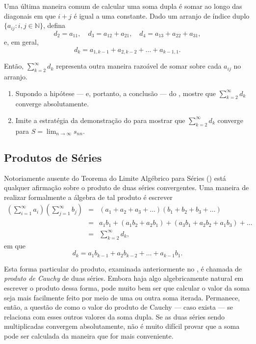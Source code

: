 Uma última maneira comum de calcular uma soma dupla é somar ao longo das diagonais em que $i + j$ é igual a uma constante. Dado um arranjo de índice duplo $\{a_{ij} : i, j \in \mathbb{N}\}$, defina
\[
d_2 = a_{11}, \quad d_3 = a_{12} + a_{21}, \quad d_4 = a_{13} + a_{22} + a_{31},
\]
e, em geral,
\[
d_k = a_{1,k-1} + a_{2,k-2} + \dots + a_{k-1,1}.
\]

Então, $\sum_{k=2}^{\infty} d_k$ representa outra maneira razoável de somar sobre cada $a_{ij}$ no arranjo.

\begin{exercise}\label{ex:2-8-6}
\begin{enumerate}[label=\alph*)]
\item Supondo a hipótese --- e, portanto, a conclusão --- do , mostre que $\sum_{k=2}^{\infty} d_k$ converge absolutamente.
\item Imite a estratégia da demonstração do  para mostrar que $\sum_{k=2}^{\infty} d_k$ converge para $S = \lim_{n \to \infty} s_{nn}$.
\end{enumerate}
\end{exercise}

\subsection{Produtos de Séries}

Notoriamente ausente do Teorema do Limite Algébrico para Séries () está qualquer afirmação sobre o produto de duas séries convergentes. Uma maneira de realizar formalmente a álgebra de tal produto é escrever
\[
\begin{array}{rcl}
\displaystyle \left(\sum_{i=1}^{\infty} a_i\right) \left(\sum_{j=1}^{\infty} b_j\right)
  & = & (a_1 + a_2 + a_3 + \dots)(b_1 + b_2 + b_3 + \dots) \\[6pt]
  & = & a_1 b_1 + (a_1 b_2 + a_2 b_1) + (a_3 b_1 + a_2 b_2 + a_1 b_3) + \dots \\[6pt]
  & = & \sum_{k=2}^{\infty} d_k,
\end{array}
\]
em que
\[
d_k = a_1 b_{k-1} + a_2 b_{k-2} + \dots + a_{k-1} b_1.
\]

Esta forma particular do produto, examinada anteriormente no , é chamada de \textit{produto de Cauchy} de duas séries. Embora haja algo algebricamente natural em escrever o produto dessa forma, pode muito bem ser que calcular o valor da soma seja mais facilmente feito por meio de uma ou outra soma iterada. Permanece, então, a questão de como o valor do produto de Cauchy --- caso exista --- se relaciona com esses outros valores da soma dupla. Se as duas séries sendo multiplicadas convergem absolutamente, não é muito difícil provar que a soma pode ser calculada da maneira que for mais conveniente. 

